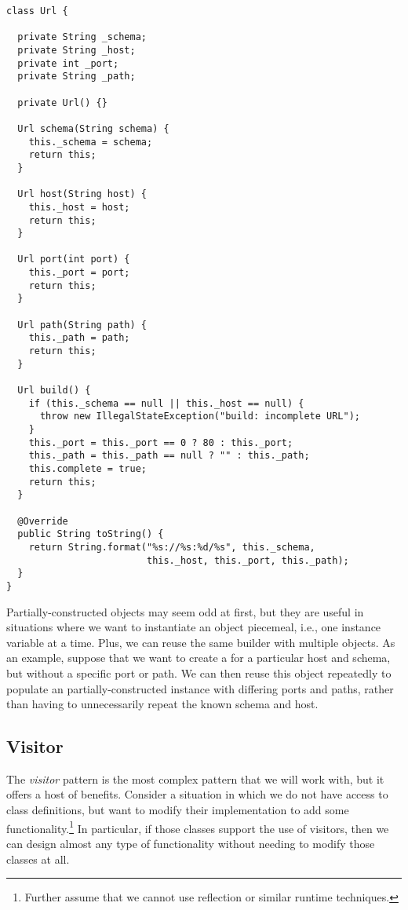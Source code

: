 \enlargethispage{1\baselineskip}
\begin{lstlisting}[language=MyJava]
class Url {

  private String _schema;
  private String _host;
  private int _port;
  private String _path;
  
  private Url() {}

  Url schema(String schema) {
    this._schema = schema;
    return this;
  }

  Url host(String host) {
    this._host = host;
    return this;
  }

  Url port(int port) {
    this._port = port;
    return this;
  }

  Url path(String path) {
    this._path = path;
    return this;
  }

  Url build() {
    if (this._schema == null || this._host == null) {
      throw new IllegalStateException("build: incomplete URL");
    }
    this._port = this._port == 0 ? 80 : this._port;
    this._path = this._path == null ? "" : this._path;
    this.complete = true;
    return this;
  }

  @Override
  public String toString() {
    return String.format("%s://%s:%d/%s", this._schema,
                         this._host, this._port, this._path);
  }
}
\end{lstlisting}

Partially-constructed objects may seem odd at first, but they are useful in situations where we want to instantiate an object piecemeal, i.e., one instance variable at a time. 
Plus, we can reuse the same builder with multiple objects. 
As an example, suppose that we want to create a  for a particular host and schema, but without a specific port or path. 
We can then reuse this object repeatedly to populate an partially-constructed instance with differing ports and paths, rather than having to unnecessarily repeat the known schema and host.

\subsection{Visitor}

The \emph{visitor} pattern is the most complex pattern that we will work with, but it offers a host of benefits. 
Consider a situation in which we do not have access to class definitions, but want to modify their implementation to add some functionality.\footnote{Further assume that we cannot use reflection or similar runtime techniques.} 
In particular, if those classes support the use of visitors, then we can design almost any type of functionality without needing to modify those classes at all.


